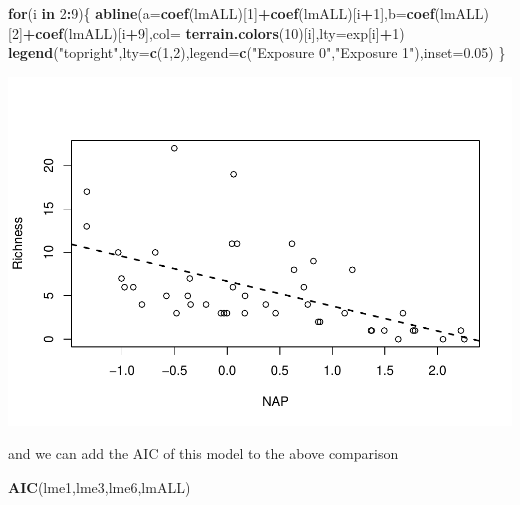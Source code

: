 \documentclass[
]{book}
\newenvironment{Shaded}{\begin{snugshade}}{\end{snugshade}}
\newcommand{\AttributeTok}[1]{\textcolor[rgb]{0.13,0.29,0.53}{#1}}
\newcommand{\ControlFlowTok}[1]{\textcolor[rgb]{0.13,0.29,0.53}{\textbf{#1}}}
\newcommand{\DecValTok}[1]{\textcolor[rgb]{0.00,0.00,0.81}{#1}}
\newcommand{\FloatTok}[1]{\textcolor[rgb]{0.00,0.00,0.81}{#1}}
\newcommand{\FunctionTok}[1]{\textcolor[rgb]{0.13,0.29,0.53}{\textbf{#1}}}
\newcommand{\NormalTok}[1]{#1}
\newcommand{\SpecialCharTok}[1]{\textcolor[rgb]{0.81,0.36,0.00}{\textbf{#1}}}
\newcommand{\StringTok}[1]{\textcolor[rgb]{0.31,0.60,0.02}{#1}}
\begin{document}
\begin{Shaded}
\begin{Highlighting}[]
\ControlFlowTok{for}\NormalTok{(i }\ControlFlowTok{in} \DecValTok{2}\SpecialCharTok{:}\DecValTok{9}\NormalTok{)\{}
  \FunctionTok{abline}\NormalTok{(}\AttributeTok{a=}\FunctionTok{coef}\NormalTok{(lmALL)[}\DecValTok{1}\NormalTok{]}\SpecialCharTok{+}\FunctionTok{coef}\NormalTok{(lmALL)[i}\SpecialCharTok{+}\DecValTok{1}\NormalTok{],}\AttributeTok{b=}\FunctionTok{coef}\NormalTok{(lmALL)[}\DecValTok{2}\NormalTok{]}\SpecialCharTok{+}\FunctionTok{coef}\NormalTok{(lmALL)[i}\SpecialCharTok{+}\DecValTok{9}\NormalTok{],}\AttributeTok{col=} \FunctionTok{terrain.colors}\NormalTok{(}\DecValTok{10}\NormalTok{)[i],}\AttributeTok{lty=}\NormalTok{exp[i]}\SpecialCharTok{+}\DecValTok{1}\NormalTok{)}
  \FunctionTok{legend}\NormalTok{(}\StringTok{"topright"}\NormalTok{,}\AttributeTok{lty=}\FunctionTok{c}\NormalTok{(}\DecValTok{1}\NormalTok{,}\DecValTok{2}\NormalTok{),}\AttributeTok{legend=}\FunctionTok{c}\NormalTok{(}\StringTok{"Exposure 0"}\NormalTok{,}\StringTok{"Exposure 1"}\NormalTok{),}\AttributeTok{inset=}\FloatTok{0.05}\NormalTok{)}
\NormalTok{\}}
\end{Highlighting}
\end{Shaded}

\includegraphics{ECOMODbook_files/figure-latex/unnamed-chunk-62-1.pdf}

and we can add the AIC of this model to the above comparison

\begin{Shaded}
\begin{Highlighting}[]
\FunctionTok{AIC}\NormalTok{(lme1,lme3,lme6,lmALL)}
\end{Highlighting}
\end{Shaded}
\end{document}
